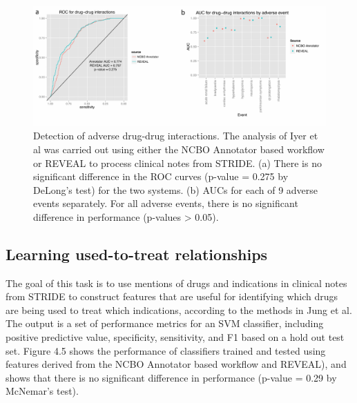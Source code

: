 \begin{figure}
  \begin{center}
    \includegraphics[width=0.9\linewidth]{ch4-figures/Figure4.pdf}
  \end{center}
  \caption[Detection of adverse drug-drug interactions]{Detection of
    adverse drug-drug interactions.  The analysis of Iyer et al was
    carried out using either the NCBO Annotator based workflow or
    REVEAL to process clinical notes from STRIDE.  (a) There is no
    significant difference in the ROC curves (p-value = 0.275 by
    DeLong’s test) for the two systems.  (b) AUCs for each of 9
    adverse events separately.  For all adverse events, there is no
    significant difference in performance (p-values > 0.05).}
  \label{fig:short}
\end{figure}


\subsection{Learning used-to-treat relationships}
The goal of this task is to use mentions of drugs and indications in
clinical notes from STRIDE to construct features that are useful for
identifying which drugs are being used to treat which indications,
according to the methods in Jung et al.  The output is a set of
performance metrics for an SVM classifier, including positive
predictive value, specificity, sensitivity, and F1 based on a hold out
test set. Figure 4.5 shows the performance of classifiers trained and
tested using features derived from the NCBO Annotator based workflow
and REVEAL), and shows that there is no significant difference in
performance (p-value = 0.29 by McNemar’s test).

